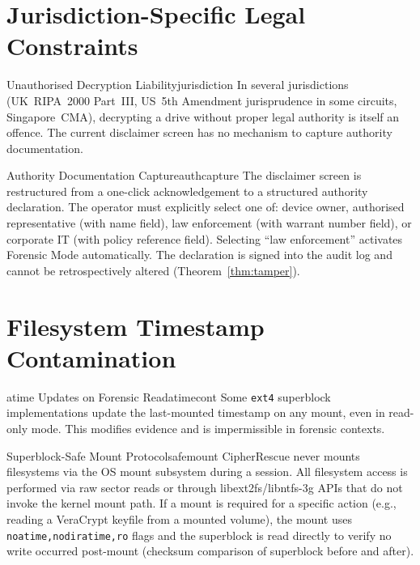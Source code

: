 \documentclass[11pt,a4paper]{report}
\begin{document}
\section{Jurisdiction-Specific Legal Constraints}

\begin{edgecase}{Unauthorised Decryption Liability}{jurisdiction}
In several jurisdictions (UK~RIPA~2000 Part~III, US~5th Amendment jurisprudence in some circuits, Singapore~CMA), decrypting a drive without proper legal authority is itself an offence. The current disclaimer screen has no mechanism to capture authority documentation.
\end{edgecase}

\begin{solution}{Authority Documentation Capture}{authcapture}
The disclaimer screen is restructured from a one-click acknowledgement to a structured authority declaration. The operator must explicitly select one of: device owner, authorised representative (with name field), law enforcement (with warrant number field), or corporate IT (with policy reference field). Selecting ``law enforcement'' activates Forensic Mode automatically. The declaration is signed into the audit log and cannot be retrospectively altered (Theorem~\ref{thm:tamper}).
\end{solution}

\section{Filesystem Timestamp Contamination}

\begin{edgecase}{atime Updates on Forensic Read}{atimecont}
Some \texttt{ext4} superblock implementations update the last-mounted timestamp on any mount, even in read-only mode. This modifies evidence and is impermissible in forensic contexts.
\end{edgecase}

\begin{solution}{Superblock-Safe Mount Protocol}{safemount}
CipherRescue never mounts filesystems via the OS mount subsystem during a session. All filesystem access is performed via raw sector reads or through libext2fs/libntfs-3g APIs that do not invoke the kernel mount path. If a mount is required for a specific action (e.g., reading a VeraCrypt keyfile from a mounted volume), the mount uses \texttt{noatime,nodiratime,ro} flags and the superblock is read directly to verify no write occurred post-mount (checksum comparison of superblock before and after).
\end{solution}
\end{document}
